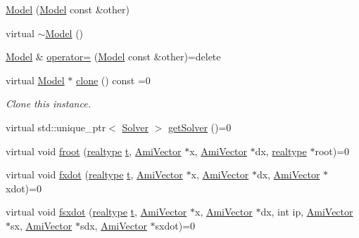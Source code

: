\begin{DoxyCompactItemize}
\item 
\mbox{\hyperlink{classamici_1_1_model_ac14ff03be3aca4544930007fafdfd3f1}{Model}} (\mbox{\hyperlink{classamici_1_1_model}{Model}} const \&other)
\item 
virtual \mbox{\hyperlink{classamici_1_1_model_a252c349b237f7779edf32778eb541a99}{$\sim$\+Model}} ()
\item 
\mbox{\hyperlink{classamici_1_1_model}{Model}} \& \mbox{\hyperlink{classamici_1_1_model_abcf360cf2836a5c7a7686a6a5c0c6bfa}{operator=}} (\mbox{\hyperlink{classamici_1_1_model}{Model}} const \&other)=delete
\item 
virtual \mbox{\hyperlink{classamici_1_1_model}{Model}} $\ast$ \mbox{\hyperlink{classamici_1_1_model_a109f753bb5889d6563476826f5a3666d}{clone}} () const =0
\begin{DoxyCompactList}\small\item\em Clone this instance. \end{DoxyCompactList}\item 
virtual std\+::unique\+\_\+ptr$<$ \mbox{\hyperlink{classamici_1_1_solver}{Solver}} $>$ \mbox{\hyperlink{classamici_1_1_model_a61d5b19b2e4d5ffcc73a014d59494344}{get\+Solver}} ()=0
\item 
virtual void \mbox{\hyperlink{classamici_1_1_model_a9124751917d81611cc237c853d9cf6b6}{froot}} (\mbox{\hyperlink{namespaceamici_a1bdce28051d6a53868f7ccbf5f2c14a3}{realtype}} \mbox{\hyperlink{classamici_1_1_model_a711281d57e9710226face29151cc4641}{t}}, \mbox{\hyperlink{classamici_1_1_ami_vector}{Ami\+Vector}} $\ast$x, \mbox{\hyperlink{classamici_1_1_ami_vector}{Ami\+Vector}} $\ast$dx, \mbox{\hyperlink{namespaceamici_a1bdce28051d6a53868f7ccbf5f2c14a3}{realtype}} $\ast$root)=0
\item 
virtual void \mbox{\hyperlink{classamici_1_1_model_a30b9be6c722585f984c9406d8831703e}{fxdot}} (\mbox{\hyperlink{namespaceamici_a1bdce28051d6a53868f7ccbf5f2c14a3}{realtype}} \mbox{\hyperlink{classamici_1_1_model_a711281d57e9710226face29151cc4641}{t}}, \mbox{\hyperlink{classamici_1_1_ami_vector}{Ami\+Vector}} $\ast$x, \mbox{\hyperlink{classamici_1_1_ami_vector}{Ami\+Vector}} $\ast$dx, \mbox{\hyperlink{classamici_1_1_ami_vector}{Ami\+Vector}} $\ast$xdot)=0
\item 
virtual void \mbox{\hyperlink{classamici_1_1_model_ac95e201045b3eda5d4684996311567c5}{fsxdot}} (\mbox{\hyperlink{namespaceamici_a1bdce28051d6a53868f7ccbf5f2c14a3}{realtype}} \mbox{\hyperlink{classamici_1_1_model_a711281d57e9710226face29151cc4641}{t}}, \mbox{\hyperlink{classamici_1_1_ami_vector}{Ami\+Vector}} $\ast$x, \mbox{\hyperlink{classamici_1_1_ami_vector}{Ami\+Vector}} $\ast$dx, int ip, \mbox{\hyperlink{classamici_1_1_ami_vector}{Ami\+Vector}} $\ast$sx, \mbox{\hyperlink{classamici_1_1_ami_vector}{Ami\+Vector}} $\ast$sdx, \mbox{\hyperlink{classamici_1_1_ami_vector}{Ami\+Vector}} $\ast$sxdot)=0

\end{DoxyCompactItemize}
